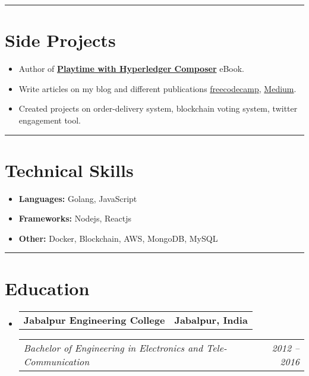 \documentclass[11pt,a4paper,hidelinks]{article}
\makeatletter
\newcommand{\headerrow}[2]
{\begin{tabular*}{\linewidth}{l@{\extracolsep{\fill}}r}
  #1 &
  #2 \\
\end{tabular*}}
\makeatother
\begin{document}
{\color{IFLightBlue} \hrule}
\vspace{-0.4em}
{\color{IFMediumBlue}\section*{Side Projects}}
\begin{itemize}
  \parskip=0.1em
    \item Author of \textbf{\href{https://schadokar.dev/ebooks/playtime-with-hyperledger-composer/}{{Playtime with Hyperledger Composer}}} eBook.
    \item Write articles on my blog and different publications \href{https://www.freecodecamp.org/news/author/schadokar/}{freecodecamp}, \href{https://medium.com/@schadokar}{Medium}.
    \item Created projects on order-delivery system, blockchain voting system, twitter engagement tool.
\end{itemize}

{\color{IFLightBlue} \hrule}
\vspace{-0.4em}
{\color{IFMediumBlue}\section*{Technical Skills}}
  \begin{itemize}
    \parskip=0.1em
    \item \textbf{Languages:} Golang, JavaScript
    \item \textbf{Frameworks:} Nodejs, Reactjs
    \item \textbf{Other:} Docker, Blockchain, AWS, MongoDB, MySQL
  \end{itemize}

{\color{IFLightBlue} \hrule}
\vspace{-0.4em}
{\color{IFMediumBlue}\section*{Education}}

\begin{itemize}
  \parskip=0.1em

  \item
        \headerrow
        {\textbf{Jabalpur Engineering College}}
        {\textbf{Jabalpur, India}}
    
        \headerrow
        {\emph{Bachelor of Engineering in Electronics and Tele-Communication}}
        {\emph{2012 -- 2016}}
\end{itemize}
\end{document}
